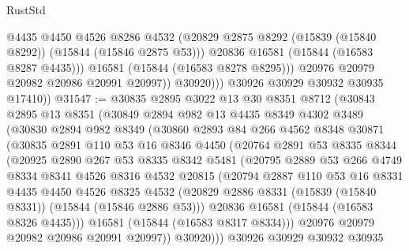 \begin{lexlean}{RustStd}
\begin{coremodule}
                      @4435
                      @4450
                      @4526
                      @8286
                      @4532
                      (@20829 @2875 @8292 (@15839 (@15840 @8292)) (@15844 (@15846 @2875 @53)))
                      @20836
                      @16581
                      (@15844 (@16583 @8287 @4435)))
                    @16581
                    (@15844 (@16583 @8278 @8295)))
                  @20976
                  @20979
                  @20982
                  @20986
                  @20991
                  @20997))
              @30920)))
        @30926
        @30929
        @30932
        @30935
        @17410))
@31547 := @30835
    @2895
    @3022
    @13
    @30
    @8351
    @8712
    (@30843
      @2895
      @13
      @8351
      (@30849
        @2894
        @982
        @13
        @4435
        @8349
        @4302
        @3489
        (@30830
          @2894
          @982
          @8349
          (@30860
            @2893
            @84
            @266
            @4562
            @8348
            @30871
            (@30835
              @2891
              @110
              @53
              @16
              @8346
              @4450
              (@20764
                @2891
                @53
                @8335
                @8344
                (@20925
                  @2890
                  @267
                  @53
                  @8335
                  @8342
                  @5481
                  (@20795
                    @2889
                    @53
                    @266
                    @4749
                    @8334
                    @8341
                    @4526
                    @8316
                    @4532
                    @20815
                    (@20794
                      @2887
                      @110
                      @53
                      @16
                      @8331
                      @4435
                      @4450
                      @4526
                      @8325
                      @4532
                      (@20829 @2886 @8331 (@15839 (@15840 @8331)) (@15844 (@15846 @2886 @53)))
                      @20836
                      @16581
                      (@15844 (@16583 @8326 @4435)))
                    @16581
                    (@15844 (@16583 @8317 @8334)))
                  @20976
                  @20979
                  @20982
                  @20986
                  @20991
                  @20997))
              @30920)))
        @30926
        @30929
        @30932
        @30935

\end{coremodule}
\end{lexlean}
